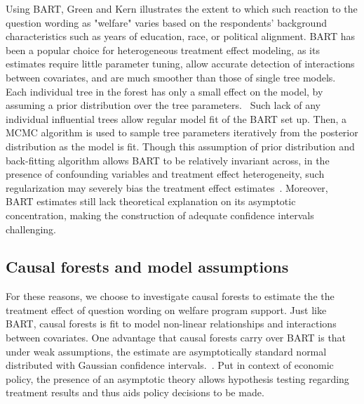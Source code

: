 \documentclass[12pt]{article}
\begin{document}
Using BART, Green and Kern illustrates the extent to which such reaction to the question wording as "welfare" varies based on the respondents' background characteristics such as years of education, race, or political alignment. BART has been a popular choice for heterogeneous treatment effect modeling, as its estimates require little parameter tuning, allow accurate detection of interactions between covariates, and are much smoother than those of single tree models. Each individual tree in the forest has only a small effect on the model, by assuming a prior distribution over the tree parameters.~\cite{Chipman2010} Such lack of any individual influential trees allow regular model fit of the BART set up. Then, a MCMC algorithm is used to sample tree parameters iteratively from the posterior distribution as the model is fit. Though this assumption of prior distribution and back-fitting algorithm allows BART to be relatively invariant across, in the presence of confounding variables and treatment effect heterogeneity, such regularization may severely bias the treatment effect estimates~\cite{CarvalhoHahnMurray}. Moreover, BART estimates still lack theoretical explanation on its asymptotic concentration, making the construction of adequate confidence intervals challenging. 

\subsection{Causal forests and model assumptions} 
For these reasons, we choose to investigate causal forests to estimate the the treatment effect of question wording on welfare program support. Just like BART, causal forests is fit to model non-linear relationships and interactions between covariates. One advantage that causal forests carry over BART is that under weak assumptions, the estimate are asymptotically standard normal distributed with Gaussian confidence intervals.~\cite{atheywager2019}. Put in context of economic policy, the presence of an asymptotic theory allows hypothesis testing regarding treatment results and thus aids policy decisions to be made. \\
\end{document}
